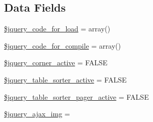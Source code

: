 \subsection*{Data Fields}
\begin{DoxyCompactItemize}
\item 
\hyperlink{class_c_i___jquery_aae273040292e1e032140a014d38f6f0c}{\$jquery\+\_\+code\+\_\+for\+\_\+load} = array()
\item 
\hyperlink{class_c_i___jquery_a807e6910954f1e8e354f7eb16332af3c}{\$jquery\+\_\+code\+\_\+for\+\_\+compile} = array()
\item 
\hyperlink{class_c_i___jquery_a86584cd6fadb4fe08bc8cf65d98da4f3}{\$jquery\+\_\+corner\+\_\+active} = F\+A\+L\+S\+E
\item 
\hyperlink{class_c_i___jquery_a29e31c754cf116ca8fb50756b582f3a9}{\$jquery\+\_\+table\+\_\+sorter\+\_\+active} = F\+A\+L\+S\+E
\item 
\hyperlink{class_c_i___jquery_a43cc145aba3c11e907fb4245f23bc44e}{\$jquery\+\_\+table\+\_\+sorter\+\_\+pager\+\_\+active} = F\+A\+L\+S\+E
\item 
\hyperlink{class_c_i___jquery_a41fe5a2b111f2b05a95712824ad1e7f4}{\$jquery\+\_\+ajax\+\_\+img} = \textquotesingle{}\textquotesingle{}
\end{DoxyCompactItemize}
